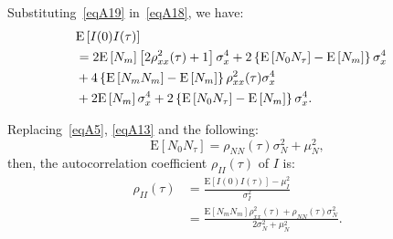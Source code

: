 \documentclass[journal]{IEEEtran}
\begin{document}
Substituting~\eqref{eqA19} in~\eqref{eqA18}, we have:
\begin{equation}
\begin{split}
\lefteqn{\mathrm{E}\left[ I(0)I(\tau) \right]} \\
& =   2 \mathrm{E}\left[N_{m}\right]\left[2\rho_{x x}^{2}(\tau) + 1\right] \sigma_{x}^{4} + 2 \left\{\mathrm{E}\left[ N_{0}N_{\tau}\right]-\mathrm{E}\left[N_{m}\right]\right\} \sigma_{x}^{4} \\
& {}+ 4 \left\{\mathrm{E}\left[N_{m} N_{m}\right]-\mathrm{E}\left[N_{m}\right] \right\} \rho_{x x}^{2}(\tau) \sigma_{x}^{4} \\
& {}+ 2 \mathrm{E}\left[N_{m}\right] \sigma_{x}^{4} + 2 \left\{\mathrm{E}\left[N_{0}N_{\tau}\right]-\mathrm{E}\left[N_{m}\right] \right\} \sigma_{x}^{4}.
\label{eqA20}
\end{split}
\end{equation}

Replacing~\eqref{eqA5}, \eqref{eqA13} and the following:
\begin{equation}
\mathrm{E}\left[ N_{0}N_{\tau}\right] = \rho_{N N}(\tau) \sigma_{N}^{2} + \mu_{N}^{2},
\label{eqA21}
\end{equation}
then, the autocorrelation coefficient $\rho_{I I}(\tau)$ of $I$ is:
\begin{equation}
\begin{split}
\rho_{I I}(\tau) & = \frac{\mathrm{E}[I(0) I(\tau)]-\mu_{I}^{2}}{\sigma_{I}^{2}} \\
& = \frac{\mathrm{E}\left[N_{m} N_{m}\right] \rho_{x x}^{2}(\tau)+\rho_{N N}(\tau) \sigma_{N}^{2}}{2 \sigma_{N}^{2}+\mu_{N}^{2}}.
\label{eqA22}
\end{split}
\end{equation}

  \newpage

\end{document}
